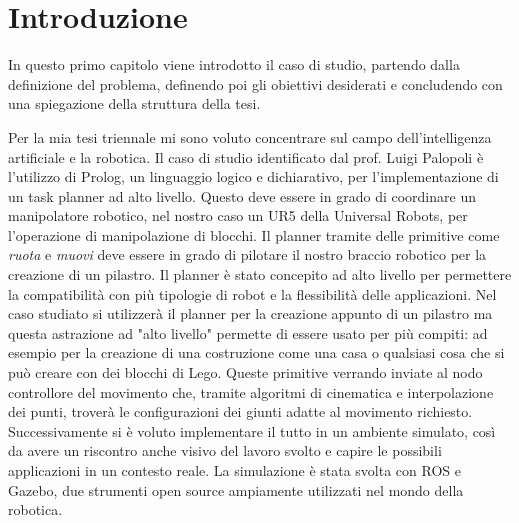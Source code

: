 \chapter{Introduzione}
\label{cha:intro}


In questo primo capitolo viene introdotto il caso di studio, partendo dalla definizione del problema, definendo poi gli obiettivi desiderati
e concludendo con una spiegazione della struttura della tesi.

Per la mia tesi triennale mi sono voluto concentrare sul campo dell'intelligenza artificiale e la robotica. Il caso di studio identificato
dal prof. Luigi Palopoli è l'utilizzo di Prolog, un linguaggio logico e dichiarativo, per l'implementazione di un task planner ad alto livello.
Questo deve essere in grado di coordinare un manipolatore robotico, nel nostro caso un UR5 della Universal Robots, per l'operazione di manipolazione di blocchi.
Il planner tramite delle primitive come \textit{ruota} e \textit{muovi} deve essere in grado di pilotare il nostro braccio robotico per la
creazione di un pilastro. Il planner è stato concepito ad alto livello per permettere la compatibilità con più tipologie di robot e la flessibilità
delle applicazioni. Nel caso studiato si utilizzerà il planner per la creazione appunto di un pilastro ma questa astrazione ad
"alto livello" permette di essere usato per più compiti: ad esempio per la creazione di una costruzione come una casa o qualsiasi cosa
che si può creare con dei blocchi di Lego. Queste primitive verrando inviate al nodo controllore del movimento che, tramite algoritmi di cinematica e
interpolazione dei punti, troverà le configurazioni dei giunti adatte al movimento richiesto. Successivamente si è voluto implementare il tutto in un
ambiente simulato, così da avere un riscontro anche visivo del lavoro svolto e capire le possibili applicazioni in un contesto reale.
La simulazione è stata svolta con ROS e Gazebo, due strumenti open source ampiamente utilizzati nel mondo della robotica.

